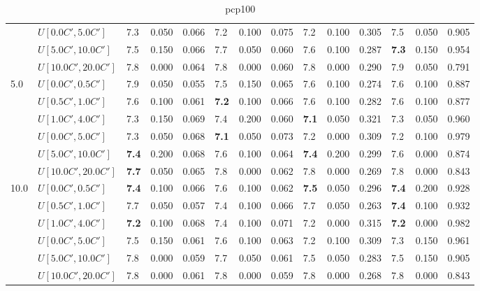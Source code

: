 \begin{table}[h]
{\begin{tabular}{|l|l||l|l|l||l|l|l||l|l|l||l|l|l|}
       & $U[0.0C',5.0C']$ & 7.3 & 0.050 & 0.066 & 7.2 & 0.100 & 0.075 & 7.2 & 0.100 & 0.305 & 7.5 & 0.050 & 0.905 \\
       & $U[5.0C',10.0C']$ & 7.5 & 0.150 & 0.066 & 7.7 & 0.050 & 0.060 & 7.6 & 0.100 & 0.287 & \textbf{7.3} & 0.150 & 0.954 \\
       & $U[10.0C',20.0C']$ & 7.8 & 0.000 & 0.064 & 7.8 & 0.000 & 0.060 & 7.8 & 0.000 & 0.290 & 7.9 & 0.050 & 0.791 \\
      \hline\hline
      \multirow{6}{*}{5.0} & $U[0.0C',0.5C']$ & 7.9 & 0.050 & 0.055 & 7.5 & 0.150 & 0.065 & 7.6 & 0.100 & 0.274 & 7.6 & 0.100 & 0.887 \\
       & $U[0.5C',1.0C']$ & 7.6 & 0.100 & 0.061 & \textbf{7.2} & 0.100 & 0.066 & 7.6 & 0.100 & 0.282 & 7.6 & 0.100 & 0.877 \\
       & $U[1.0C',4.0C']$ & 7.3 & 0.150 & 0.069 & 7.4 & 0.200 & 0.060 & \textbf{7.1} & 0.050 & 0.321 & 7.3 & 0.050 & 0.960 \\
       & $U[0.0C',5.0C']$ & 7.3 & 0.050 & 0.068 & \textbf{7.1} & 0.050 & 0.073 & 7.2 & 0.000 & 0.309 & 7.2 & 0.100 & 0.979 \\
       & $U[5.0C',10.0C']$ & \textbf{7.4} & 0.200 & 0.068 & 7.6 & 0.100 & 0.064 & \textbf{7.4} & 0.200 & 0.299 & 7.6 & 0.000 & 0.874 \\
       & $U[10.0C',20.0C']$ & \textbf{7.7} & 0.050 & 0.065 & 7.8 & 0.000 & 0.062 & 7.8 & 0.000 & 0.269 & 7.8 & 0.000 & 0.843 \\
      \hline\hline
      \multirow{6}{*}{10.0} & $U[0.0C',0.5C']$ & \textbf{7.4} & 0.100 & 0.066 & 7.6 & 0.100 & 0.062 & \textbf{7.5} & 0.050 & 0.296 & \textbf{7.4} & 0.200 & 0.928 \\
       & $U[0.5C',1.0C']$ & 7.7 & 0.050 & 0.057 & 7.4 & 0.100 & 0.066 & 7.7 & 0.050 & 0.263 & \textbf{7.4} & 0.100 & 0.932 \\
       & $U[1.0C',4.0C']$ & \textbf{7.2} & 0.100 & 0.068 & 7.4 & 0.100 & 0.071 & 7.2 & 0.000 & 0.315 & \textbf{7.2} & 0.000 & 0.982 \\
       & $U[0.0C',5.0C']$ & 7.5 & 0.150 & 0.061 & 7.6 & 0.100 & 0.063 & 7.2 & 0.100 & 0.309 & 7.3 & 0.150 & 0.961 \\
       & $U[5.0C',10.0C']$ & 7.8 & 0.000 & 0.059 & 7.7 & 0.050 & 0.061 & 7.5 & 0.050 & 0.283 & 7.5 & 0.150 & 0.905 \\
       & $U[10.0C',20.0C']$ & 7.8 & 0.000 & 0.061 & 7.8 & 0.000 & 0.059 & 7.8 & 0.000 & 0.268 & 7.8 & 0.000 & 0.843 \\
      \hline
      \end{tabular}
      }
      \caption{pcp100}
      \label{tab:pcp100}\end{table}
      
